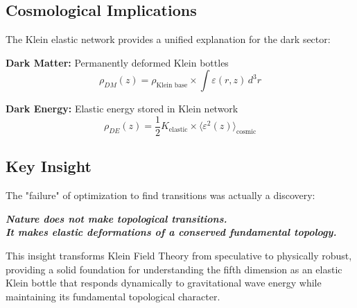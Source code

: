 \documentclass[12pt]{iopart}
\begin{document}
\subsection{Cosmological Implications}

The Klein elastic network provides a unified explanation for the dark sector:

\textbf{Dark Matter:} Permanently deformed Klein bottles
\begin{equation}
\rho_{DM}(z) = \rho_{\text{Klein base}} \times \int \varepsilon(r,z) \, d^3r
\end{equation}

\textbf{Dark Energy:} Elastic energy stored in Klein network
\begin{equation}
\rho_{DE}(z) = \frac{1}{2} K_{\text{elastic}} \times \langle\varepsilon^2(z)\rangle_{\text{cosmic}}
\end{equation}

\subsection{Key Insight}

The "failure" of optimization to find transitions was actually a discovery:

\begin{center}
\textit{\textbf{Nature does not make topological transitions.\\
It makes elastic deformations of a conserved fundamental topology.}}
\end{center}

This insight transforms Klein Field Theory from speculative to physically robust, providing a solid foundation for understanding the fifth dimension as an elastic Klein bottle that responds dynamically to gravitational wave energy while maintaining its fundamental topological character.
\end{document}
